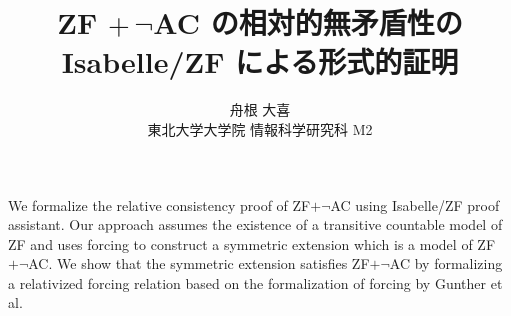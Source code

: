 \documentclass{article}
\title{{\Large ZF $+\, \neg$AC の相対的無矛盾性の\\Isabelle/ZF による形式的証明}}
\author{舟根 大喜 \\ 東北大学大学院 情報科学研究科 M2}
\date{} %
\begin{document}
\maketitle

\vspace{-2em}

We formalize the relative consistency proof of ZF$+\neg$AC using Isabelle/ZF proof assistant.
Our approach assumes the existence of a transitive countable model of ZF and uses forcing to construct a symmetric extension which is a model of ZF$+\neg$AC.
We show that the symmetric extension satisfies ZF$+\neg$AC by formalizing a relativized forcing relation based on the formalization of forcing by Gunther et al.
\end{document}
